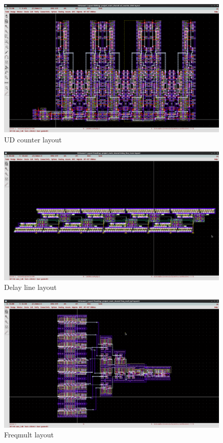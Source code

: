 \documentclass[a4paper,12pt]{article} \usepackage{graphicx}
\begin{document}
\begin{figure}[h]
  \centering
  \includegraphics[width=1.0\textwidth]{../Bilder/Layout/ud_counter_6bit.png}
  \caption{UD counter layout}
  \label{fig:counter_final}
\end{figure}

\begin{figure}[h]
  \centering
  \includegraphics[width=1.0\textwidth]{../Bilder/Layout/delay_line_trans.png}
  \caption{Delay line layout}
  \label{fig:delay_final}
\end{figure}

\begin{figure}[h]
  \centering
  \includegraphics[width=1.0\textwidth]{../Bilder/Layout/freq_mult_tpl.png}
  \caption{Freqmult layout}
  \label{fig:freq_mult_final}
\end{figure}
\end{document}
